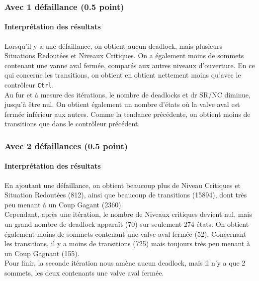 \documentclass[a4paper]{book}
\begin{document}
\subsubsection{Avec 1 défaillance (0.5 point)}





\paragraph{Interprétation des résultats}
Lorsqu'il y a une défaillance, on obtient aucun deadlock, mais plusieurs Situations Redoutées et Niveaux Critiques. 
On a également moins de sommets contenant une vanne aval fermée, comparés aux autres niveaux d'ouverture. En ce qui concerne les 
transitions, on obtient en obtient nettement moins qu'avec le contrôleur {\tt Ctrl}. \\
Au fur et à mesure des itérations, le nombre de deadlocks et dr SR/NC diminue, jusqu'à être nul. On obtient également un nombre d'états où la valve aval est fermée
inférieur aux autres. Comme la tendance précédente, on obtient moins de transitions que dans le contrôleur précédent.

\subsubsection{Avec 2 défaillances (0.5 point)}




%
\paragraph{Interprétation des résultats}
En ajoutant une défaillance, on obtient beaucoup plus de Niveau Critiques et 
Situation Redoutées (812), ainsi que beaucoup de transitions (15894), dont très peu menant à un Coup Gagant (2360). \\
Cependant, après une itération, le nombre de Niveaux critiques devient nul, mais un grand nombre de deadlock apparaît (70)
sur seulement 274 états. On obtient également moins de sommets contenant une valve aval fermée (52).
Concernant les transitions, il y a moins de transitions (725) mais toujours très peu menant à un Coup Gagnant (155).\\
Pour finir, la seconde itération nous amène aucun deadlock, mais il n'y a que 2 sommets, les deux contenants une valve aval fermée.
\end{document}
